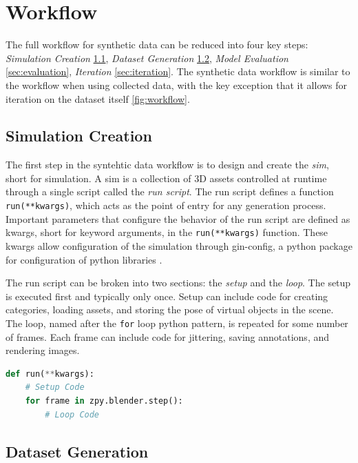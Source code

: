 \documentclass{article}
\begin{document}
\section{Workflow}
\label{sec:workflow}

The full workflow for synthetic data can be reduced into four key steps: \emph{Simulation Creation} \ref{sec:worflowsimcreation}, \emph{Dataset Generation} \ref{sec:generation}, \emph{Model Evaluation} \ref{sec:evaluation}, \emph{Iteration} \ref{sec:iteration}. The synthetic data workflow is similar to the workflow when using collected data, with the key exception that it allows for iteration on the dataset itself \ref{fig:workflow}.

\subsection{Simulation Creation}
\label{sec:worflowsimcreation}

The first step in the syntehtic data workflow is to design and create the \emph{sim}, short for simulation. A sim is a collection of 3D assets controlled at runtime through a single script called the \emph{run script}. The run script defines a function \lstinline{run(**kwargs)}, which acts as the point of entry for any generation process. Important parameters that configure the behavior of the run script are defined as kwargs, short for keyword arguments, in the \lstinline{run(**kwargs)} function. These kwargs allow configuration of the simulation through gin-config, a python package for configuration of python libraries \cite{ginconfig}.

The run script can be broken into two sections: the \emph{setup} and the \emph{loop}. The setup is executed first and typically only once. Setup can include code for creating categories, loading assets, and storing the pose of virtual objects in the scene. The loop, named after the \lstinline{for} loop python pattern, is repeated for some number of frames. Each frame can include code for jittering, saving annotations, and rendering images.

\begin{lstlisting}[language=Python,caption={Basic structure of the run function in a sim run script.},label={lst:setuploop}]
def run(**kwargs):
	# Setup Code
	for frame in zpy.blender.step():
		# Loop Code
\end{lstlisting}


\subsection{Dataset Generation}
\label{sec:generation}
\end{document}
